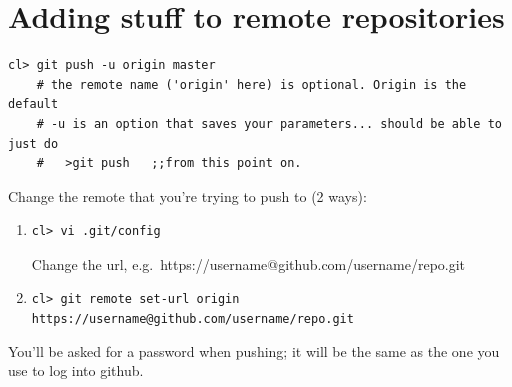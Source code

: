 \documentclass{article}
\begin{document}
\section{Adding stuff to remote repositories}
\begin{verbatim}
cl> git push -u origin master
    # the remote name ('origin' here) is optional. Origin is the default
    # -u is an option that saves your parameters... should be able to just do
    #   >git push   ;;from this point on.
\end{verbatim}

Change the remote that you're trying to push to (2 ways):
\begin{enumerate}
    \item \begin{verbatim}cl> vi .git/config \end{verbatim}
      Change the url, e.g.\ https://username@github.com/username/repo.git
    \item \texttt{cl> git remote set-url origin https://username@github.com/username/repo.git}
\end{enumerate}

You'll be asked for a password when pushing; it will be the same as
the one you use to log into github.
\end{document}
